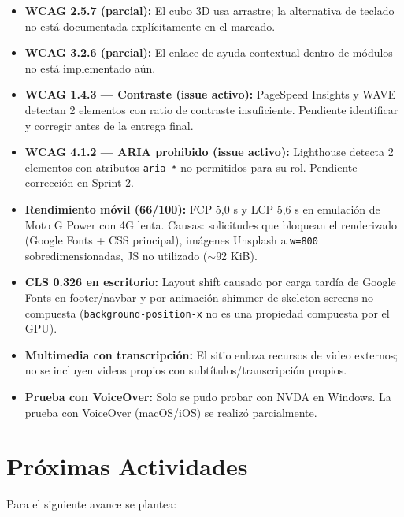 \documentclass[12pt, a4paper]{article}
\begin{document}
\begin{itemize}
  \item \textbf{WCAG 2.5.7 (parcial):} El cubo 3D usa arrastre; la alternativa de teclado no está documentada explícitamente en el marcado.
  \item \textbf{WCAG 3.2.6 (parcial):} El enlace de ayuda contextual dentro de módulos no está implementado aún.
  \item \textbf{WCAG 1.4.3 --- Contraste (issue activo):} PageSpeed Insights y WAVE detectan 2 elementos con ratio de contraste insuficiente. Pendiente identificar y corregir antes de la entrega final.
  \item \textbf{WCAG 4.1.2 --- ARIA prohibido (issue activo):} Lighthouse detecta 2 elementos con atributos \texttt{aria-*} no permitidos para su rol. Pendiente corrección en Sprint 2.
  \item \textbf{Rendimiento móvil (66/100):} FCP 5,0 s y LCP 5,6 s en emulación de Moto G Power con 4G lenta. Causas: solicitudes que bloquean el renderizado (Google Fonts + CSS principal), imágenes Unsplash a \texttt{w=800} sobredimensionadas, JS no utilizado ($\sim$92 KiB).
  \item \textbf{CLS 0.326 en escritorio:} Layout shift causado por carga tardía de Google Fonts en footer/navbar y por animación shimmer de skeleton screens no compuesta (\texttt{background-position-x} no es una propiedad compuesta por el GPU).
  \item \textbf{Multimedia con transcripción:} El sitio enlaza recursos de video externos; no se incluyen videos propios con subtítulos/transcripción propios.
  \item \textbf{Prueba con VoiceOver:} Solo se pudo probar con NVDA en Windows. La prueba con VoiceOver (macOS/iOS) se realizó parcialmente.
\end{itemize}

\section{Próximas Actividades}

Para el siguiente avance se plantea:
\end{document}
